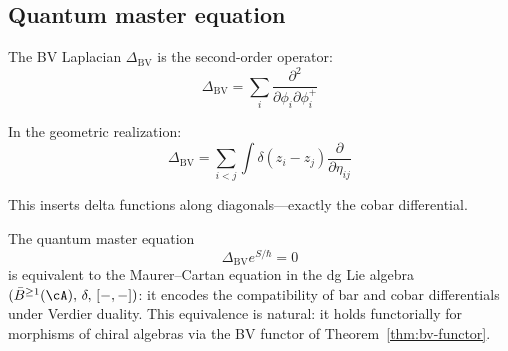 \subsection{Quantum master equation}

\begin{definition}[BV Laplacian]
The BV Laplacian $\Delta_{\text{BV}}$ is the second-order operator:
\[\Delta_{\text{BV}} = \sum_i \frac{\partial^2}{\partial \phi_i \partial \phi_i^+}\]

In the geometric realization:
\[\Delta_{\text{BV}} = \sum_{i<j} \int \delta(z_i - z_j) 
\frac{\partial}{\partial \eta_{ij}}\]

This inserts delta functions along diagonals—exactly the cobar differential.
\end{definition}

\begin{theorem}
\label{thm:qme-bar-cobar}
The quantum master equation
\[\Delta_{\text{BV}} e^{S/\hbar} = 0\]
is equivalent to the Maurer--Cartan equation in the dg Lie algebra
$(\bar{B}^{\ge 1}(\cA),\, \delta,\, [-,-])$: it encodes the
compatibility of bar and cobar differentials under Verdier duality.
This equivalence is natural: it holds functorially for morphisms of
chiral algebras via the BV functor of Theorem~\ref{thm:bv-functor}.
\end{theorem}

